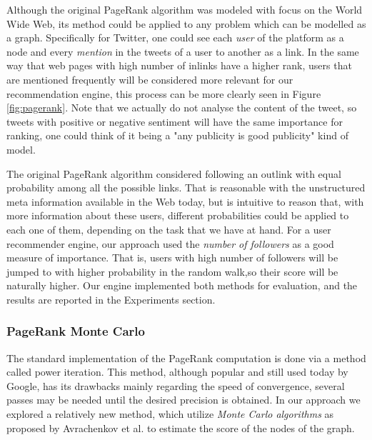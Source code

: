Although the original PageRank algorithm was modeled with focus on the World
Wide Web, its method could be applied to any problem which can be modelled as a
graph. Specifically for Twitter, one could see each \emph{user} of the platform
as a node and every \emph{mention} in the tweets of a user to another as a link.
In the same way that web pages with high number of inlinks have a higher rank,
users that are mentioned frequently will be considered more relevant for our
recommendation engine, this process can be more clearly seen in Figure
\ref{fig:pagerank}. Note that we actually do not analyse the content of the
tweet, so tweets with positive or negative sentiment will have the same
importance for ranking, one could think of it being a "any publicity is good
publicity" kind of model.

The original PageRank algorithm considered following an outlink with equal
probability among all the possible links. That is reasonable with the
unstructured meta information available in the Web today, but is intuitive to
reason that, with more information about these users, different probabilities
could be applied to each one of them, depending on the task that we have at
hand. For a user recommender engine, our approach used the \emph{number of
followers} as a good measure of importance. That is, users with high number of
followers will be jumped to with higher probability in the random walk,so their
score will be naturally higher. Our engine implemented both methods for
evaluation, and the results are reported in the Experiments section.

\subsubsection{PageRank Monte Carlo}

The standard implementation of the PageRank computation is done via a method called power iteration. This method, although popular and still used today
by Google, has its drawbacks mainly regarding the speed of convergence, several
passes may be needed until the desired precision is obtained. In our approach we
explored a relatively new method, which utilize \emph{Monte Carlo algorithms} as proposed by Avrachenkov et al.
\cite{prmc} to
estimate the score of the nodes of the graph.

